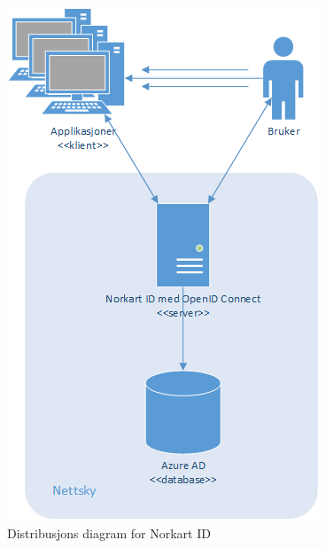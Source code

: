 \begin{figure}[H]
    \centering
    \includegraphics[scale=0.55]{graphics/04-arkitektur/UtviklingsViewDistribusjonsDiagram.png}
    \caption{Distribusjons diagram for Norkart ID }
    \label{fig:UtviklingsViewDistribusjonsDiagram}
\end{figure}